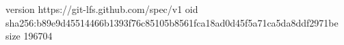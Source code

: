 version https://git-lfs.github.com/spec/v1
oid sha256:b89e9d45514466b1393f76c85105b8561fca18ad0d45f5a71ca5da8ddf2971be
size 196704
